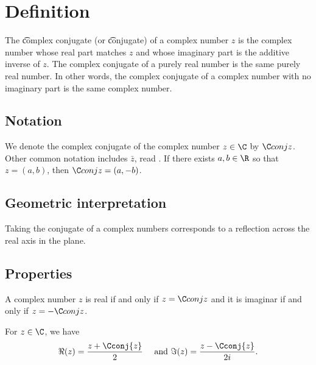 
\section*{Definition}

The \t{complex conjugate} (or \t{conjugate}) of a complex number $z$ is the complex number whose real part matches $z$ and whose imaginary part is the additive inverse of $z$.
The complex conjugate of a purely real number is the same purely real number.
In other words, the complex conjugate of a complex number with no imaginary part is the same complex number.

\subsection*{Notation}

We denote the complex conjugate of the complex number $z \in \C $ by $\C conj{z}$.
Other common notation includes $\bar{z}$, read .
If there exists $a, b \in \R $ so that $z = (a, b)$, then $\C conj{z} = (a, -b)$.

\subsection*{Geometric interpretation}

Taking the conjugate of a complex numbers corresponds to a reflection across the real axis in the plane.

\subsection*{Properties}

A complex number $z$ is real if and only if $z = \C conj{z}$ and it is imaginar if and only if $z = -\C conj{z}$.

\begin{proposition}
For $z \in \C $, we have
  \[
\Re (z) = \frac{z + \Cconj{z}}{2} \quad \text{ and } \Im (z) = \frac{z - \Cconj{z}}{2i}.
  \]
\end{proposition}

\blankpage
